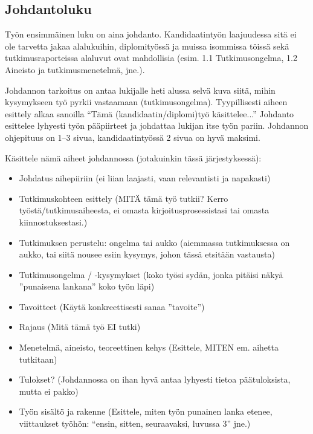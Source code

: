 \subsection{Johdantoluku}

Työn ensimmäinen luku on aina johdanto. Kandidaatintyön laajuudessa
sitä ei ole tarvetta jakaa alalukuihin, diplomityössä ja muissa
isommissa töissä sekä tutkimusraporteissa alaluvut ovat mahdollisia
(esim. 1.1 Tutkimusongelma, 1.2 Aineisto ja tutkimusmenetelmä, jne.).

Johdannon tarkoitus on antaa lukijalle heti alussa selvä kuva siitä,
mihin kysymykseen työ pyrkii vastaamaan
(tutkimusongelma). Tyypillisesti aiheen esittely alkaa sanoilla ``Tämä
(kandidaatin/diplomi)työ käsittelee...''  Johdanto esittelee lyhyesti
työn pääpiirteet ja johdattaa lukijan itse työn pariin. Johdannon
ohjepituus on 1--3 sivua, kandidaatintyössä 2 sivua on hyvä maksimi.

Käsittele nämä aiheet johdannossa (jotakuinkin tässä järjestyksessä):
%
\begin{itemize}
 \item Johdatus aihepiiriin 
(ei liian laajasti, vaan relevantisti ja napakasti)
%
 \item Tutkimuskohteen esittely (MITÄ tämä työ tutkii? 
Kerro työstä/tutkimusaiheesta, ei omasta kirjoitusprosessistasi 
tai omasta kiinnostuksestasi.)
%
 \item Tutkimuksen perustelu: ongelma tai aukko 
(aiemmassa tutkimuksessa on aukko, tai siitä nousee esiin 
kysymys, johon tässä etsitään vastausta)
%
 \item Tutkimusongelma / -kysymykset (koko työsi sydän, 
jonka pitäisi näkyä ''punaisena lankana'' koko työn läpi)
 \item Tavoitteet (Käytä konkreettisesti sanaa ''tavoite'')
 \item Rajaus (Mitä tämä työ EI tutki)
 \item Menetelmä, aineisto, teoreettinen kehys (Esittele, 
MITEN em. aihetta tutkitaan)
 \item Tulokset? (Johdannossa on ihan hyvä antaa lyhyesti 
tietoa päätuloksista, mutta ei pakko)
 \item Työn sisältö ja rakenne (Esittele, miten työn punainen 
lanka etenee, viittaukset työhön: 
``ensin, sitten, seuraavaksi, luvussa 3'' jne.)
\end{itemize}


